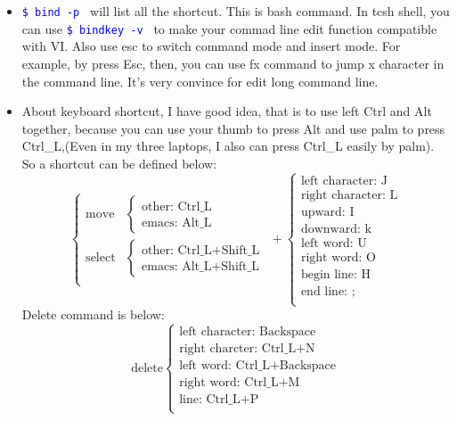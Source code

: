 \documentclass[a4paper,11pt,twoside]{book}
\newcommand{\linuxcommand}[1]{\texttt{\textcolor{blue}{\$ #1 \Pisymbol{psy}{191}}}}
\begin{document}
\begin{itemize}
		\item \linuxcommand{bind -p} will list all the shortcut. This is bash command. In tcsh shell, you can use \linuxcommand{bindkey -v} to make your commad line edit function compatible with VI. Also use esc to switch command mode and insert mode. For example, by press Esc, then, you can use fx command to jump x character in the command line. It's very convince for edit long command line.

		\item  About keyboard shortcut, I have good idea, that is to use left Ctrl and Alt together, because you can use your thumb to press Alt and use palm to press Ctrl\_L,(Even in my three laptops, I also can press Ctrl\_L easily by palm).
	So a shortcut can be defined below:
	\[ \left\{ \begin{array}{cl}
	            \textrm{move} & \left\{ \begin{array}{c} \textrm{other: Ctrl\_L} \\ \textrm{emacs: Alt\_L} \end{array}  \right. \\
		    \textrm{select} & \left\{ \begin{array}{c} \textrm{other: Ctrl\_L+Shift\_L} \\ \textrm{emacs: Alt\_L+Shift\_L} \end{array}  \right. \\
	           \end{array} \right. + \left\{ \begin{array}{c}
						\textrm{left character: J} \\
						\textrm{right character: L}\\
						\textrm{upward: I}\\
						\textrm{downward: k}\\
						\textrm{left word: U}\\
						\textrm{right word: O} \\
						\textrm{begin line: H}\\
						\textrm{end line: ;}\\
						\end{array} \right.
	\]
	Delete command is below: \\
	\[ \textrm{delete} \left\{ \begin{array}{l}
	            \textrm{left character: Backspace}  \\
		    \textrm{right charcter: Ctrl\_L+N} \\
		     \textrm{left word: Ctrl\_L+Backspace}  \\
		    \textrm{right word: Ctrl\_L+M} \\
		     \textrm{line: Ctrl\_L+P}  \\
	           \end{array} \right.
	\]
	


\end{itemize}
\end{document}
